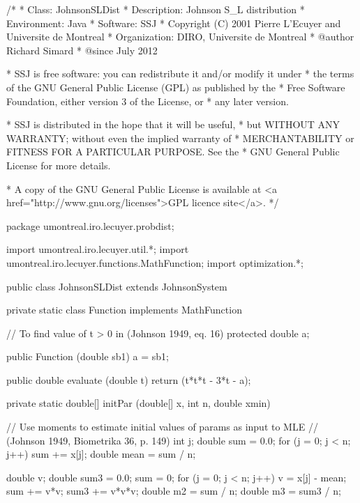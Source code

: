 \begin{code}
\begin{hide}
/*
 * Class:        JohnsonSLDist
 * Description:  Johnson S_L distribution
 * Environment:  Java
 * Software:     SSJ
 * Copyright (C) 2001  Pierre L'Ecuyer and Universite de Montreal
 * Organization: DIRO, Universite de Montreal
 * @author       Richard Simard
 * @since        July 2012

 * SSJ is free software: you can redistribute it and/or modify it under
 * the terms of the GNU General Public License (GPL) as published by the
 * Free Software Foundation, either version 3 of the License, or
 * any later version.

 * SSJ is distributed in the hope that it will be useful,
 * but WITHOUT ANY WARRANTY; without even the implied warranty of
 * MERCHANTABILITY or FITNESS FOR A PARTICULAR PURPOSE.  See the
 * GNU General Public License for more details.

 * A copy of the GNU General Public License is available at
   <a href="http://www.gnu.org/licenses">GPL licence site</a>.
 */
\end{hide}
package umontreal.iro.lecuyer.probdist;\begin{hide}
import umontreal.iro.lecuyer.util.*;
import umontreal.iro.lecuyer.functions.MathFunction;
import optimization.*;
\end{hide}

public class JohnsonSLDist extends JohnsonSystem\begin{hide} {

   private static class Function implements MathFunction
   {
      // To find value of t > 0 in (Johnson 1949, eq. 16)
      protected double a;

      public Function (double sb1) {
         a = sb1;
      }

      public double evaluate (double t) {
         return (t*t*t - 3*t - a);
      }
   }


   private static double[] initPar (double[] x, int n, double xmin)
   {
      // Use moments to estimate initial values of params as input to MLE
      // (Johnson 1949, Biometrika 36, p. 149)
      int j;
      double sum = 0.0;
      for (j = 0; j < n; j++) {
         sum += x[j];
      }
      double mean = sum / n;

      double v;
      double sum3 = 0.0;
      sum = 0;
      for (j = 0; j < n; j++) {
         v = x[j] - mean;
         sum += v*v;
         sum3 += v*v*v;
      }
      double m2 = sum / n;
      double m3 = sum3 / n;

}}
\end{hide}
\end{code}
